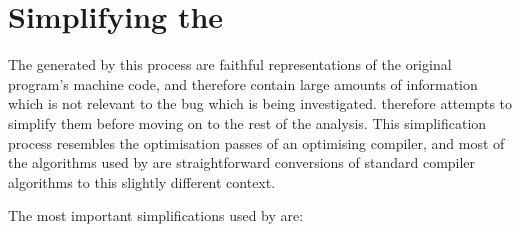 \section{Simplifying the {\StateMachine}}
\label{sect:derive:simplify_sm}

The {\StateMachines} generated by this process are faithful
representations of the original program's machine code, and therefore
contain large amounts of information which is not relevant to the bug
which is being investigated.  {\Technique} therefore attempts to
simplify them before moving on to the rest of the analysis.  This
simplification process resembles the optimisation passes of an
optimising compiler, and most of the algorithms used by {\technique}
are straightforward conversions of standard compiler algorithms to
this slightly different context.

The most important simplifications used by {\technique} are:

